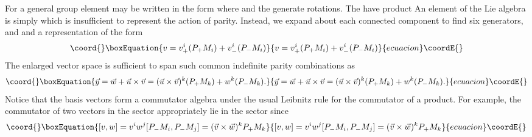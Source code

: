 \documentclass[a4paper,12pt]{article}
\begin{document}
For \coordHE{} a general group element may be written in the form \coordHE{} where \myHighlight{$\alpha \in \{+,-\},$}\coordHE{}  \coordHE{} and the \coordHE{} generate rotations. The \coordHE{} have product \coordHE{}
An element of the Lie algebra is simply \coordHE{} which is
insufficient to represent the action of parity. Instead, we expand about
each connected component to find six generators, \coordHE{} and \coordHE{} and a representation of the form 
\begin{equation}\coord{}\boxEquation{
v=v_{+}^{i}(P_{+}M_{i})+v_{-}^{i}(P_{-}M_{i})
}{
v=v_{+}^{i}(P_{+}M_{i})+v_{-}^{i}(P_{-}M_{i})
}{ecuacion}\coordE{}\end{equation}
The enlarged vector space is sufficient to span such common indefinite
parity combinations as 
\begin{equation}\coord{}\boxEquation{
\vec{y}=\vec{w}+\vec{u}\times \vec{v}=(\vec{u}\times \vec{v}
)^{k}(P_{+}M_{k})+w^{k}(P_{-}M_{k}).
}{
\vec{y}=\vec{w}+\vec{u}\times \vec{v}=(\vec{u}\times \vec{v}
)^{k}(P_{+}M_{k})+w^{k}(P_{-}M_{k}).
}{ecuacion}\coordE{}\end{equation}
Notice that the basis vectors form a commutator algebra under the usual
Leibnitz rule for the commutator of a product. For example, the commutator
of two vectors in the \coordHE{} sector appropriately lie in the \coordHE{} sector
since 
\begin{equation}\coord{}\boxEquation{
\lbrack v,w]=v^{i}w^{j}[P_{-}M_{i},P_{-}M_{j}]=(\vec{v}\times \vec{w}
)^{k}P_{+}M_{k}
}{
\lbrack v,w]=v^{i}w^{j}[P_{-}M_{i},P_{-}M_{j}]=(\vec{v}\times \vec{w}
)^{k}P_{+}M_{k}
}{ecuacion}\coordE{}\end{equation}
\end{document}
